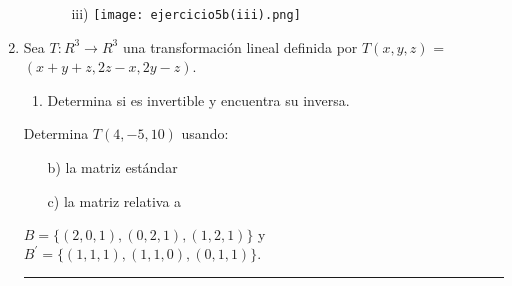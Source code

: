 \documentclass[a4paper,10pt]{article}
\makeatletter
\newcommand{\xRightarrow}[2][]{\ext@arrow 0359\Rightarrowfill@{#1}{#2}}
\newenvironment{bmatrixcolor}[1][red]
  {\colorlet{savethecolor}{.}\colorlet{bracecolor}{#1}%
    \color{bracecolor}\left[\color{savethecolor}\begin{matrix}}
  {\end{matrix}\color{bracecolor}\right]}
\makeatother
\begin{document}
\begin{enumerate}
\begin{enumerate}
\begin{enumerate}
              \item [iii)]
                \texttt{[image: ejercicio5b(iii).png]}
    

            \end{enumerate}        



      \end{enumerate}
 \newpage

\item Sea $T : R^3 \rightarrow R^3 $ una transformación lineal definida por $T(x, y, z)$ = $(x+y +z, 2z -x, 2y -z)$.      
      \begin{enumerate}
        \item Determina si es invertible y encuentra su inversa.
      \end{enumerate}
      Determina $T(4, −5, 10)$ usando:
      \begin{enumerate}
        \item [b)] la matriz estándar
        \item [c)] la matriz relativa a
      \end{enumerate}

      $B = \{(2, 0, 1),(0, 2, 1),(1, 2, 1)\}$ y  $B^{'} = \{(1, 1, 1),(1, 1, 0),(0, 1, 1)\}.$



      {\color{amber} \rule{\linewidth}{0.5mm} }

      \begin{enumerate}
        \item [a)] $A=\begin{bmatrixcolor}[sangria]
          1 & 1 & 1  \\
          -1 & 0 & 2\\
          0 & 2 & -1     
        \end{bmatrixcolor}$} \\\\

        $ A= \left[
          \begin{array}{ccc:ccc}
          1 &1 &1 &  1 & 0 & 0\\ 
          -1 &0 &2 &  0 & 1 & 0\\
          0 &2 &-1 &  0 & 0 & 1\\ 
          \end{array} \right]$ \hspace{.2cm}{$\xRightarrow{\mathit{F_{1}+F_{2}}}}$}\hspace{.2cm}{$\left[
            \begin{array}{ccc:ccc}
            1 &1 &1 &  1 & 0 & 0\\ 
            0 &1 &3 &  1 & 1 & 0\\
            0 &2 &-1 &  0 & 0 & 1\\ 
            \end{array} \right] $}\hspace{.2cm}{$\xRightarrow{\mathit{-2F_{2}+F_{3}}}}$} \\\\


\end{enumerate}
\end{enumerate}
\end{document}
